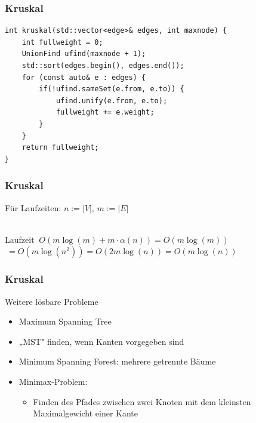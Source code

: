 \begin{frame}[fragile]
\frametitle{Kruskal}
\begin{lstlisting}[basicstyle=\footnotesize]
int kruskal(std::vector<edge>& edges, int maxnode) {
    int fullweight = 0;
    UnionFind ufind(maxnode + 1);
    std::sort(edges.begin(), edges.end());
    for (const auto& e : edges) {
        if(!ufind.sameSet(e.from, e.to)) {
            ufind.unify(e.from, e.to);
            fullweight += e.weight;
        }
    }
    return fullweight;
}
\end{lstlisting}
\end{frame}

\begin{frame}
\frametitle{Kruskal}
Für Laufzeiten: $n:=|V|$, $m:=|E|$ \\~\\
\begin{block}{Laufzeit}
$\ O(m\log(m)+ m\cdot\alpha(n))=O(m\log(m))$\\$\ =O(m\log(n^2))=O(2m\log(n))=O(m\log(n))$

\end{block}
\end{frame}


\begin{frame}
\frametitle{Kruskal}
\begin{block}{Weitere lösbare Probleme}
\begin{itemize}
\item Maximum Spanning Tree
\item „MST" finden, wenn Kanten vorgegeben sind
\item Minimum Spanning Forest: mehrere getrennte Bäume
\item Minimax-Problem:
\begin{itemize}
\item Finden des Pfades zwischen zwei Knoten mit dem kleinsten Maximalgewicht einer Kante
\end{itemize}
\end{itemize}
\end{block}
\end{frame}
